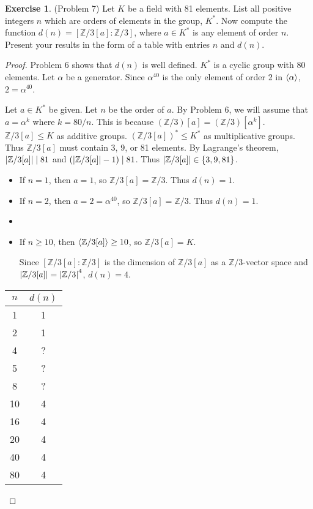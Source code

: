\documentclass[12pt, psamsfonts]{amsart}
\theoremstyle{definition}
\newtheorem*{exer}{Exercise}
\theoremstyle{remark}
\numberwithin{equation}{section}
\begin{document}
\begin{exer}{(Problem 7)}
  Let $K$ be a field with 81 elements.
  List all positive integers $n$ which are orders of elements in the group, $K^*$.
  Now compute the function $d(n) = [\mathbb{Z}/3[a]:\mathbb{Z}/3]$, where $a \in K^*$ is any element of order $n$.
  Present your results in the form of a table with entries $n$ and $d(n)$.
\end{exer}

\begin{proof}
  Problem 6 shows that $d(n)$ is well defined.
  $K^*$ is a cyclic group with 80 elements.
  Let $\alpha$ be a generator.
  Since $\alpha^{40}$ is the only element of order 2 in $\ev{ \alpha }$, $2 = \alpha^{40}$.

  Let $a \in K^*$ be given.
  Let $n$ be the order of $a$.
  By Problem 6, we will assume that $a = \alpha^k$ where $k = 80 / n$.
  This is because $(\mathbb{Z}/3)[a] = (\mathbb{Z}/3)[\alpha^k]$.
  $\mathbb{Z}/3[a] \leq K$ as additive groups.
  $(\mathbb{Z}/3[a])^* \leq K^*$ as multiplicative groups.
  Thus $\mathbb{Z}/3[a]$ must contain 3, 9, or 81 elements.
  By Lagrange's theorem, $\abs{\mathbb{Z}/3[a]} \mid 81$ and $(\abs{\mathbb{Z}/3[a]} - 1) \mid 81$.
  Thus $\abs{\mathbb{Z}/3[a]} \in \{ 3, 9, 81 \}$.

  \begin{itemize}
    \item
      If $n = 1$, then $a = 1$, so $\mathbb{Z}/3[a] = \mathbb{Z}/3$.
      Thus $d(n) = 1$.
    \item
      If $n = 2$, then $a = 2 = \alpha^{40}$, so $\mathbb{Z}/3[a] = \mathbb{Z}/3$.
      Thus $d(n) = 1$.
    \item
    \item
      If $n \geq 10$, then $\ev{ \mathbb{Z}/3[a] } \geq 10$, so $\mathbb{Z}/3[a] = K$.

      Since $[\mathbb{Z}/3[a] : \mathbb{Z}/3]$ is the dimension of $\mathbb{Z}/3[a]$ as a $\mathbb{Z}/3$-vector space and $\abs{ \mathbb{Z}/3[a] } = \abs{ \mathbb{Z}/3 }^4$, $d(n) = 4$.
  \end{itemize}

  \begin{center}
    \begin{tabular}{ |c|c| }
      \hline
        $n$ & $d(n)$ \\
      \hline
        1 & 1 \\
      \hline
        2 & 1 \\
      \hline
        4 & ? \\
      \hline
        5 & ? \\
      \hline
        8 & ? \\
      \hline
        10 & 4 \\
      \hline
        16 & 4 \\
      \hline
        20 & 4 \\
      \hline
        40 & 4 \\
      \hline
        80 & 4 \\
      \hline
    \end{tabular}
  \end{center}



\end{proof}
\end{document}
